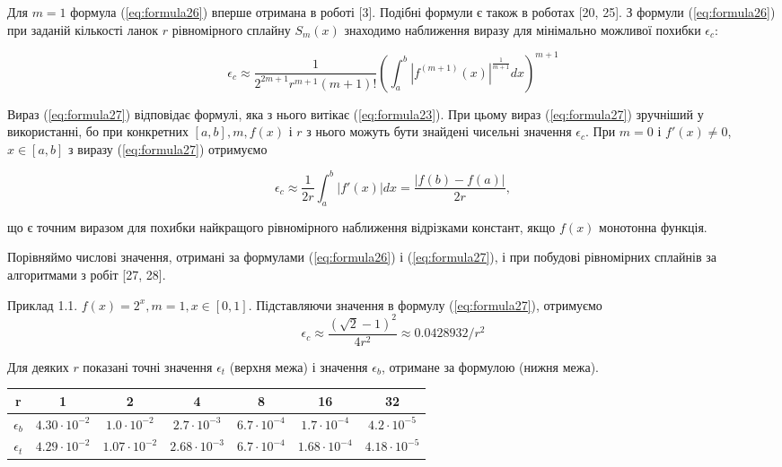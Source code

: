 \documentclass[ukrainian,14pt]{extarticle}
\begin{document}
Для $m = 1$ формула (\ref{eq:formula26}) вперше отримана в роботі [3].
Подібні формули є також в роботах [20, 25]. З формули (\ref{eq:formula26}) при заданій кількості ланок $r$ рівномірного сплайну $S_m(x)$ знаходимо наближення виразу для мінімально можливої похибки $\epsilon_c$: 

\begin{equation}\label{eq:formula27}
  \epsilon_c \approx \frac{1}{2^{2m+1} r^{m+1} (m+1)!} \left( \int_a^b \left|f^{(m+1)}(x)\right|^{\frac{1}{m+1} }dx \right)^{m+1}  
\end{equation}

Вираз (\ref{eq:formula27}) відповідає формулі, яка з нього витікає (\ref{eq:formula23}). При цьому вираз (\ref{eq:formula27}) зручніший у використанні, бо при конкретних $[a, b], m, f(x)$ і $r$ з нього можуть бути знайдені чисельні значення $\epsilon_c$. При $m = 0$ і $f'(x) \neq 0$, $x \in [a, b]$ з виразу (\ref{eq:formula27}) отримуємо

\begin{equation}\label{eq:formula28}
    \epsilon_c \approx \frac{1}{2r} \int_a^b |f'(x)|dx = \frac{|f(b) - f(a)|}{2r},
\end{equation}

що є точним виразом для похибки найкращого рівномірного наближення відрізками констант, якщо $f(x)$ монотонна функція.

Порівняймо числові значення, отримані за формулами (\ref{eq:formula26}) і (\ref{eq:formula27}), і при побудові рівномірних сплайнів за алгоритмами з робіт [27, 28].

\vspace{1cm}

Приклад 1.1. $f(x) = 2^x, m = 1, x \in [0, 1]$. Підставляючи значення в формулу (\ref{eq:formula27}), отримуємо
$$\epsilon_c \approx \frac{(\sqrt{2} - 1)^2}{4r^2} \approx 0.0428932 / r^2$$

Для деяких $r$ показані точні значення $\epsilon_t$ (верхня межа) і значення $\epsilon_b$, отримане за формулою (нижня межа).

\bgroup
\def\arraystretch{1.5}%
\begin{center}
\begin{tabular}{ c | c |
c | c | c | c | c }
 r & 1 & 2 & 4 & 8 & 16 & 32 \\
 \hline
 $\epsilon_b$ & $4.30 \cdot 10^{-2}$ & $1.0 \cdot 10^{-2}$ & $2.7 \cdot 10^{-3}$ & $6.7 \cdot 10^{-4}$ & $1.7 \cdot 10^{-4}$ & $4.2 \cdot 10^{-5}$ \\  
 \hline
 $\epsilon_t$ & $4.29 \cdot 10^{-2}$ & $1.07 \cdot 10^{-2}$ & $2.68 \cdot 10^{-3}$ & $6.7 \cdot 10^{-4}$ & $1.68 \cdot 10^{-4}$ & $4.18 \cdot 10^{-5}$    
\end{tabular}
\end{center}
\egroup
\end{document}
